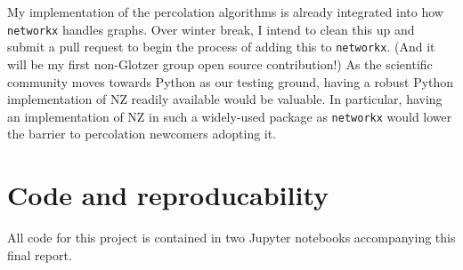 \documentclass[11pt]{article}   	%
\begin{document}
My implementation of the percolation algorithms is already integrated into how \verb|networkx| handles graphs. Over winter break, I intend to clean this up and submit a pull request to begin the process of adding this to \verb|networkx|. (And it will be my first non-Glotzer group open source contribution!)
As the scientific community moves towards Python as our testing ground, having a robust Python implementation of NZ readily available would be valuable. 
In particular, having an implementation of NZ in such a widely-used package as \verb|networkx| would lower the barrier to percolation newcomers adopting it.

\section{Code and reproducability}
All code for this project is contained in two Jupyter notebooks accompanying this final report.

\newpage


\end{document}
